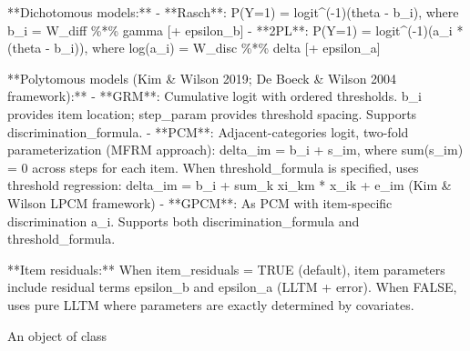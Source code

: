 \documentclass[a4paper]{book}
\begin{document}
%
\begin{Details}
**Dichotomous models:**
- **Rasch**: P(Y=1) = logit\textasciicircum{}(-1)(theta - b\_i), where b\_i = W\_diff \%*\% gamma [+ epsilon\_b]
- **2PL**: P(Y=1) = logit\textasciicircum{}(-1)(a\_i * (theta - b\_i)), where log(a\_i) = W\_disc \%*\% delta [+ epsilon\_a]

**Polytomous models (Kim \& Wilson 2019; De Boeck \& Wilson 2004 framework):**
- **GRM**: Cumulative logit with ordered thresholds. b\_i provides item location;
step\_param provides threshold spacing. Supports discrimination\_formula.
- **PCM**: Adjacent-categories logit, two-fold parameterization (MFRM approach):
delta\_im = b\_i + s\_im, where sum(s\_im) = 0 across steps for each item.
When threshold\_formula is specified, uses threshold regression:
delta\_im = b\_i + sum\_k xi\_km * x\_ik + e\_im (Kim \& Wilson LPCM framework)
- **GPCM**: As PCM with item-specific discrimination a\_i.
Supports both discrimination\_formula and threshold\_formula.

**Item residuals:** When item\_residuals = TRUE (default), item parameters include
residual terms epsilon\_b and epsilon\_a (LLTM + error). When FALSE, uses pure LLTM
where parameters are exactly determined by covariates.
\end{Details}
%
\begin{Value}
An object of class 
\end{Value}
%
\end{document}
